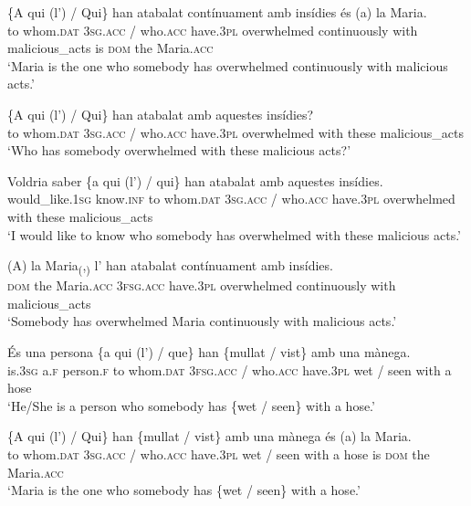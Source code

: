 \documentclass[output=paper,colorlinks,citecolor=brown,modfonts,nonflat]{langsci/langscibook}
\begin{document}
{{ \ex \label{ex:royo:16b}
	\gll \{A qui (l’) / Qui\} han atabalat contínuament amb insídies és (a) la Maria.\\
	 to whom.\textsc{dat} \textsc{3sg.acc} / who.\textsc{acc} have.\textsc{3pl} overwhelmed continuously with malicious\_acts is \textsc{dom} the Maria.\textsc{acc}\\
	\glt ‘Maria is the one who somebody has overwhelmed continuously with malicious acts.’



 \ex \label{ex:royo:16c}
 \gll \{A qui (l’) / Qui\} han atabalat amb aquestes insídies?\\
to whom.\textsc{dat} \textsc{3sg.acc} / who.\textsc{acc} have.\textsc{3pl} overwhelmed with these malicious\_acts\\
\glt ‘Who has somebody overwhelmed with these malicious acts?’

 \ex \label{ex:royo:16d}
 \gll Voldria saber \{a qui (l’) / qui\} han atabalat amb aquestes insídies.\\
 would\_like.\textsc{1sg} know.\textsc{inf}  to whom.\textsc{dat} \textsc{3sg.acc} / who.\textsc{acc} have.\textsc{3pl} overwhelmed with these malicious\_acts\\
\glt ‘I would like to know who somebody has overwhelmed with these malicious acts.’

\ex \label{ex:royo:16e}
 \gll (A) la Maria\textsubscript{(},\textsubscript{)}  l’ han atabalat contínuament amb insídies.\\
 \textsc{dom} the Maria.\textsc{acc} \textsc{3fsg.acc} have.\textsc{3pl} overwhelmed continuously with malicious\_acts\\
\glt ‘Somebody has overwhelmed Maria continuously with malicious acts.’

 \z
 \z


\ea%
 \label{ex:royo:17}
 \ea \label{ex:royo:17a}
 \gll És una persona \{a qui (l’) / que\} han \{mullat / vist\} amb una mànega.\\
 is.\textsc{3sg} a.\textsc{f} person.\textsc{f} to whom.\textsc{dat} \textsc{3fsg.acc} / who.\textsc{acc} have.\textsc{3pl} wet / seen with a hose\\
\glt ‘He/She is a person who somebody has \{wet / seen\} with a hose.’

 \ex \label{ex:royo:17b}
 \gll \{A qui (l’) / Qui\} han \{mullat / vist\} amb una mànega és (a) la Maria.\\
 to whom.\textsc{dat} \textsc{3sg.acc} / who.\textsc{acc} have.\textsc{3pl} wet / seen with a hose is \textsc{dom} the Maria.\textsc{acc}\\
\glt ‘Maria is the one who somebody has \{wet / seen\} with a hose.’

}}
\end{document}
